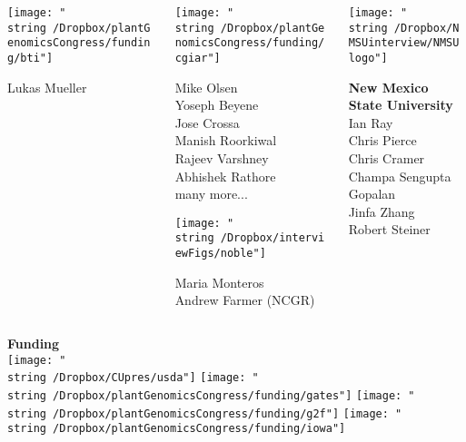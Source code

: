 \documentclass[11pt, aspectratio=169]{beamer}
\begin{document}
{\begin{columns}
\begin{column}{0.2\linewidth}
\vspace{0.5cm}

\texttt{[image: "\\string~/Dropbox/plantGenomicsCongress/funding/bti"]}

\scriptsize 
Lukas Mueller \\

\end{column}


\begin{column}{0.2\linewidth}


\texttt{[image: "\\string~/Dropbox/plantGenomicsCongress/funding/cgiar"]}

\scriptsize 
Mike Olsen \\
Yoseph Beyene \\
Jose Crossa \\
Manish Roorkiwal \\
Rajeev Varshney \\
Abhishek Rathore \\
many more...

\vspace{0.3cm}

\texttt{[image: "\\string~/Dropbox/interviewFigs/noble"]}

\scriptsize 
Maria Monteros \\
Andrew Farmer (NCGR)

\end{column}

\begin{column}{0.2\linewidth}


\texttt{[image: "\\string~/Dropbox/NMSUinterview/NMSUlogo"]}

\normalsize {\textbf{New Mexico State University}}
\scriptsize 
Ian Ray\\
Chris Pierce\\
Chris Cramer\\
Champa Sengupta Gopalan\\
Jinfa Zhang\\
Robert Steiner\\
\end{column}

\end{columns}

\textbf{Funding}\\
\texttt{[image: "\\string~/Dropbox/CUpres/usda"]} \hspace{0.5cm}
\texttt{[image: "\\string~/Dropbox/plantGenomicsCongress/funding/gates"]} \hspace{0.5cm}
\texttt{[image: "\\string~/Dropbox/plantGenomicsCongress/funding/g2f"]} \hspace{0.5cm}
\texttt{[image: "\\string~/Dropbox/plantGenomicsCongress/funding/iowa"]}


}
\end{document}
